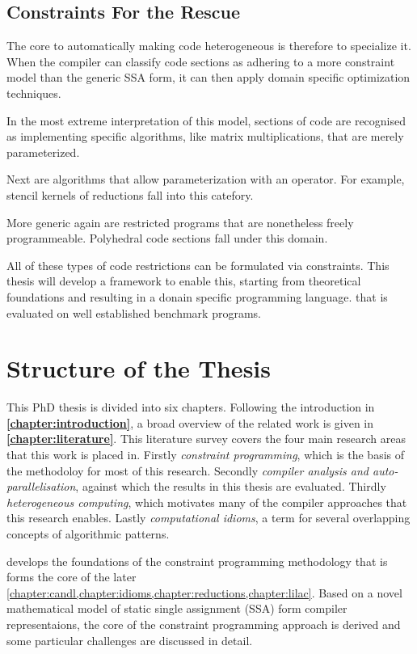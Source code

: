     \subsection{Constraints For the Rescue}
    The core to automatically making code heterogeneous is therefore to specialize it.
    When the compiler can classify code sections as adhering to a more constraint
    model than the generic SSA form, it can then apply domain specific optimization techniques.

    In the most extreme interpretation of this model, sections of code are
    recognised as implementing specific algorithms, like matrix multiplications,
    that are merely parameterized.

    Next are algorithms that allow parameterization with an operator.
    For example, stencil kernels of reductions fall into this catefory.

    More generic again are restricted programs that are nonetheless freely
    programmeable.
    Polyhedral code sections fall under this domain.

    All of these types of code restrictions can be formulated via constraints.
    This thesis will develop a framework to enable this, starting from
    theoretical foundations and resulting in a donain specific programming
    language. that is evaluated on well established benchmark programs.


\pagebreak
\section{Structure of the Thesis}

    This PhD thesis is divided into six chapters.
    Following the introduction in {\bf\cref{chapter:introduction}}, a broad
    overview of the related work is given in {\bf\cref{chapter:literature}}.
    This literature survey covers the four main research areas that this work
    is placed in.
    Firstly {\em constraint programming}, which is the basis of the methodoloy
    for most of this research.
    Secondly {\em compiler analysis and auto-parallelisation}, against which the
    results in this thesis are evaluated.
    Thirdly {\em heterogeneous computing}, which motivates many of the compiler
    approaches that this research enables.
    Lastly {\em computational idioms}, a term for several overlapping concepts
    of algorithmic patterns.

    {\bf{}} develops the foundations of the constraint
    programming methodology that is forms the core of the later
    \cref{chapter:candl,chapter:idioms,chapter:reductions,chapter:lilac}.
    Based on a novel mathematical model of static single assignment (SSA) form
    compiler representaions, the core of the constraint programming approach
    is derived and some particular challenges are discussed in detail.

